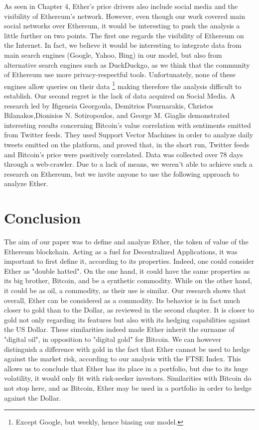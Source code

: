 \documentclass[11pt]{report}
\begin{document}
As seen in Chapter 4, Ether's price drivers also include social media and the visibility of Ethereum's network. However, even though our work covered main social networks over Ethereum, it would be interesting to push the analysis a little further on two points. \newline
The first one regards the visibility of Ethereum on the Internet. In fact, we believe it would be interesting to integrate data from main search engines (Google, Yahoo, Bing) in our model, but also from alternative search engines such as DuckDuckgo, as we think that the community of Ethereum use more privacy-respectful tools. Unfortunately, none of these engines allow queries on their data \footnote{Except Google, but weekly, hence biasing our model.} making therefore the analysis difficult to establish.\newline
Our second regret is the lack of data acquired on Social Media. A research led by Ifigeneia Georgoula, Demitrios Pournarakis, Christos Bilanakos,Dionisios N. Sotiropoulos, and George M. Giaglis \cite{SENTIMENT} demonstrated interesting results concerning Bitcoin's value correlation with sentiments emitted from Twitter feeds. They used Support Vector Machines in order to analyze daily tweets emitted on the platform, and proved that, in the short run, Twitter feeds and Bitcoin's price were positively correlated. Data was collected over 78 days through a web-crawler. Due to a lack of means, we weren't able to achieve such a research on Ethereum, but we invite anyone to use the following approach to analyze Ether.

\chapter*{Conclusion}

The aim of our paper was to define and analyze Ether, the token of value of the Ethereum blockchain. Acting as a fuel for Decentralized Applications, it was important to first define it, according to its properties. Indeed, one could consider Ether as "double hatted". On the one hand, it could have the same properties as its big brother, Bitcoin, and be a synthetic commodity. While on the other hand, it could be as oil, a commodity, as their use is similar.\newline
Our research shows that overall, Ether can be considered as a commodity. Its behavior is in fact much closer to gold than to the Dollar, as reviewed in the second chapter. It is closer to gold not only regarding its features but also with its hedging capabilities against the US Dollar. These similarities indeed made Ether inherit the surname of "digital oil", in opposition to "digital gold" for Bitcoin.\newline
We can however distinguish a difference with gold in the fact that Ether cannot be used to hedge against the market risk, according to our analysis with the FTSE Index. This allows us to conclude that Ether has its place in a portfolio, but due to its huge volatility, it would only fit with risk-seeker investors. Similarities with Bitcoin do not stop here, and as Bitcoin, Ether may be used in a portfolio in order to hedge against the Dollar. \newline
\end{document}

